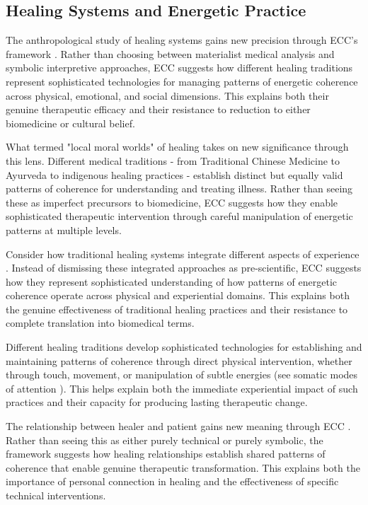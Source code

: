 \begin{refsection}
\subsection{Healing Systems and Energetic Practice}

The anthropological study of healing systems gains new precision through ECC's framework \cite{csordas1993somatic}. Rather than choosing between materialist medical analysis and symbolic interpretive approaches, ECC suggests how different healing traditions represent sophisticated technologies for managing patterns of energetic coherence across physical, emotional, and social dimensions. This explains both their genuine therapeutic efficacy and their resistance to reduction to either biomedicine or cultural belief.

What \cite{kleinman1980patients} termed "local moral worlds" of healing takes on new significance through this lens. Different medical traditions - from Traditional Chinese Medicine to Ayurveda to indigenous healing practices - establish distinct but equally valid patterns of coherence for understanding and treating illness. Rather than seeing these as imperfect precursors to biomedicine, ECC suggests how they enable sophisticated therapeutic intervention through careful manipulation of energetic patterns at multiple levels.

Consider how traditional healing systems integrate different aspects of experience \cite{kapferer1991celebration}. Instead of dismissing these integrated approaches as pre-scientific, ECC suggests how they represent sophisticated understanding of how patterns of energetic coherence operate across physical and experiential domains. This explains both the genuine effectiveness of traditional healing practices and their resistance to complete translation into biomedical terms.

Different healing traditions develop sophisticated technologies for establishing and maintaining patterns of coherence through direct physical intervention, whether through touch, movement, or manipulation of subtle energies (see somatic modes of attention \cite{csordas1993somatic}). This helps explain both the immediate experiential impact of such practices and their capacity for producing lasting therapeutic change.

The relationship between healer and patient gains new meaning through ECC \cite{laderman1991taming}. Rather than seeing this as either purely technical or purely symbolic, the framework suggests how healing relationships establish shared patterns of coherence that enable genuine therapeutic transformation. This explains both the importance of personal connection in healing and the effectiveness of specific technical interventions.


\end{refsection}
